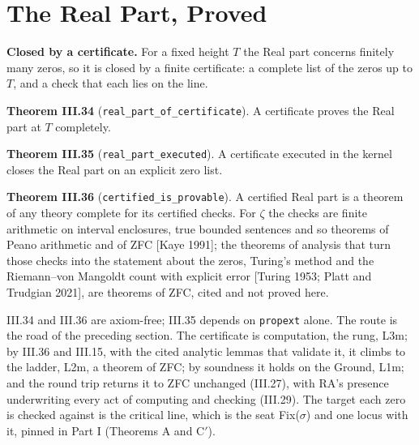 \documentclass[10pt,twocolumn]{article}
\begin{document}
\hypertarget{the-real-part-proved}{%
\section{The Real Part, Proved}\label{the-real-part-proved}}

\textbf{Closed by a certificate.} For a fixed height \(T\) the Real part
concerns finitely many zeros, so it is closed by a finite certificate: a
complete list of the zeros up to \(T\), and a check that each lies on
the line.

\textbf{Theorem III.34} (\texttt{real\_part\_of\_certificate}). A
certificate proves the Real part at \(T\) completely.

\textbf{Theorem III.35} (\texttt{real\_part\_executed}). A certificate
executed in the kernel closes the Real part on an explicit zero list.

\textbf{Theorem III.36} (\texttt{certified\_is\_provable}). A certified
Real part is a theorem of any theory complete for its certified checks.
For \(\zeta\) the checks are finite arithmetic on interval enclosures,
true bounded sentences and so theorems of Peano arithmetic and of ZFC
{[}Kaye 1991{]}; the theorems of analysis that turn those checks into
the statement about the zeros, Turing's method and the Riemann--von
Mangoldt count with explicit error {[}Turing 1953; Platt and Trudgian
2021{]}, are theorems of ZFC, cited and not proved here.

III.34 and III.36 are axiom-free; III.35 depends on \texttt{propext}
alone. The route is the road of the preceding section. The certificate
is computation, the rung, L3m; by III.36 and III.15, with the cited
analytic lemmas that validate it, it climbs to the ladder, L2m, a
theorem of ZFC; by soundness it holds on the Ground, L1m; and the round
trip returns it to ZFC unchanged (III.27), with RA's presence
underwriting every act of computing and checking (III.29). The target
each zero is checked against is the critical line, which is the seat
Fix(\(\sigma\)) and one locus with it, pinned in Part I (Theorems A and
C\('\)).
\end{document}
